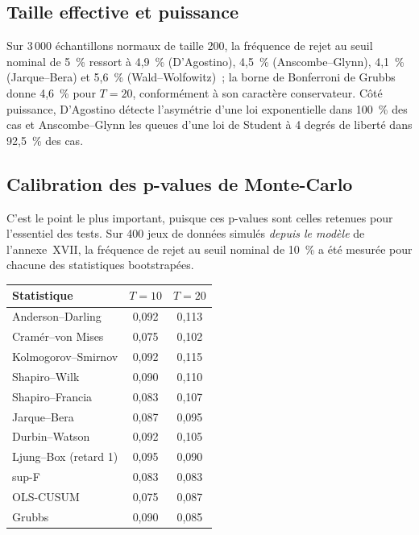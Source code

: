 \documentclass[a4paper,11pt]{article}
\begin{document}
\subsection*{Taille effective et puissance}

Sur 3\,000 échantillons normaux de taille 200, la fréquence de rejet au seuil nominal de 5~\%
ressort à 4,9~\% (D'Agostino), 4,5~\% (Anscombe--Glynn), 4,1~\% (Jarque--Bera) et 5,6~\%
(Wald--Wolfowitz)~; la borne de Bonferroni de Grubbs donne 4,6~\% pour $T=20$, conformément à son
caractère conservateur. Côté puissance, D'Agostino détecte l'asymétrie d'une loi exponentielle
dans 100~\% des cas et Anscombe--Glynn les queues d'une loi de Student à 4 degrés de liberté
dans 92,5~\% des cas.

\subsection*{Calibration des p-values de Monte-Carlo}

C'est le point le plus important, puisque ces p-values sont celles retenues pour l'essentiel des
tests. Sur 400 jeux de données simulés \emph{depuis le modèle} de l'annexe~XVII, la fréquence de
rejet au seuil nominal de 10~\% a été mesurée pour chacune des statistiques bootstrapées.

\begin{center}
\small
\begin{tabular}{@{}lcc@{}}
\toprule
\textbf{Statistique} & \textbf{$T = 10$} & \textbf{$T = 20$} \\
\midrule
Anderson--Darling      & 0,092 & 0,113 \\
Cramér--von Mises      & 0,075 & 0,102 \\
Kolmogorov--Smirnov    & 0,092 & 0,115 \\
Shapiro--Wilk          & 0,090 & 0,110 \\
Shapiro--Francia       & 0,083 & 0,107 \\
Jarque--Bera           & 0,087 & 0,095 \\
Durbin--Watson         & 0,092 & 0,105 \\
Ljung--Box (retard 1)  & 0,095 & 0,090 \\
sup-F                  & 0,083 & 0,083 \\
OLS-CUSUM              & 0,075 & 0,087 \\
Grubbs                 & 0,090 & 0,085 \\
\bottomrule
\end{tabular}
\end{center}
\end{document}
